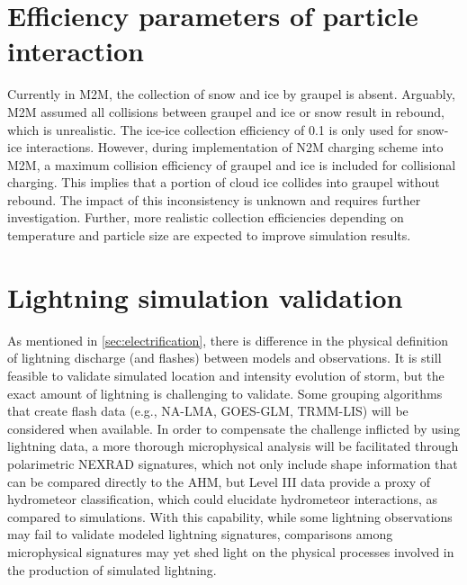 \section{Efficiency parameters of particle interaction}
Currently in M2M, the collection of snow and ice by graupel is absent. Arguably, M2M assumed all collisions between graupel and ice or snow result in rebound, which is unrealistic. The ice-ice collection efficiency of 0.1 is only used for snow-ice interactions. However, during implementation of N2M charging scheme into M2M, a maximum collision efficiency of graupel and ice is included for collisional charging. This implies that a portion of cloud ice collides into graupel without rebound. The impact of this inconsistency is unknown and requires further investigation. Further, more realistic collection efficiencies depending on temperature and particle size are expected to improve simulation results.
\section{Lightning simulation validation}
As mentioned in \ref{sec:electrification}, there is difference in the physical definition of lightning discharge (and flashes) between models and observations. It is still feasible to validate simulated location and intensity evolution of storm, but the exact amount of lightning is challenging to validate. Some grouping algorithms that create flash data (e.g., NA-LMA, GOES-GLM, TRMM-LIS) will be considered when available. In order to compensate the challenge inflicted by using lightning data, a more thorough microphysical analysis will be facilitated through polarimetric NEXRAD signatures, which not only include shape information that can be compared directly to the AHM, but Level III data provide a proxy of hydrometeor classification, which could elucidate hydrometeor interactions, as compared to simulations. With this capability, while some lightning observations may fail to validate modeled lightning signatures, comparisons among microphysical signatures may yet shed light on the physical processes involved in the production of simulated lightning.

